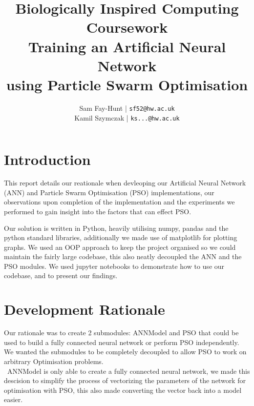 \documentclass[11pt]{article}
\begin{document}
\title{%
	\bf Biologically Inspired Computing\\ 
    \large Coursework \\
    Training an Artificial Neural Network\\
     using Particle Swarm Optimisation}

\author{
	Sam Fay-Hunt | \texttt{sf52@hw.ac.uk}\\
	Kamil Szymczak | \texttt{ks...@hw.ac.uk}
}

\maketitle
\thispagestyle{empty}
\pagebreak

\tableofcontents
\thispagestyle{empty}
\pagebreak


\setcounter{page}{1}

\section{Introduction}
This report details our reationale when devleoping our Artificial Neural Network (ANN) and Particle Swarm Optimisation (PSO) implementations, our observations upon completion of the implementation and the experiments we performed to gain insight into the factors that can effect PSO.

Our solution is written in Python, heavily utilising numpy, pandas and the python standard libraries, additionally we made use of matplotlib for plotting graphs.
We used an OOP approach to keep the project organised so we could maintain the fairly large codebase, this also neatly decoupled the ANN and the PSO modules.
We used jupyter notebooks to demonstrate how to use our codebase, and to present our findings.

\section{Development Rationale}
Our rationale was to create 2 submodules: ANNModel and PSO that could be used to build a fully connected neural network or perform PSO independently.
We wanted the submodules to be completely decoupled to allow PSO to work on arbitrary Optimisation problems.\\

\noindent~ANNModel is only able to create a fully connected neural network, we made this descision to simplify the process of vectorizing the parameters of the network for optimisation with PSO, this also made converting the vector back into a model easier.
\end{document}
